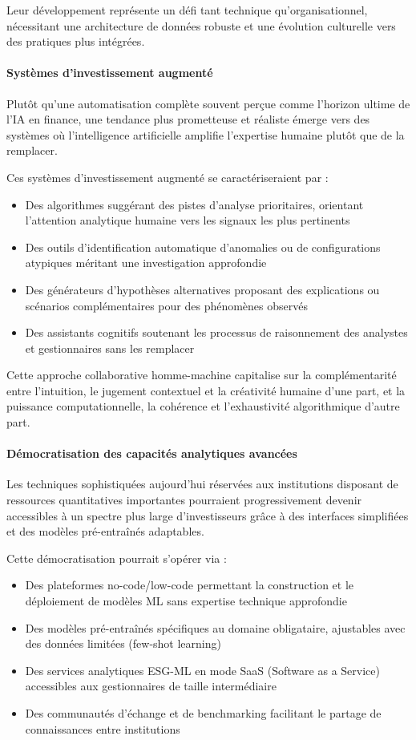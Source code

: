 Leur développement représente un défi tant technique qu'organisationnel, nécessitant une architecture de données robuste et une évolution culturelle vers des pratiques plus intégrées.

\paragraph{Systèmes d'investissement augmenté} 
Plutôt qu'une automatisation complète souvent perçue comme l'horizon ultime de l'IA en finance, une tendance plus prometteuse et réaliste émerge vers des systèmes où l'intelligence artificielle amplifie l'expertise humaine plutôt que de la remplacer.

Ces systèmes d'investissement augmenté se caractériseraient par :
\begin{itemize}
    \item Des algorithmes suggérant des pistes d'analyse prioritaires, orientant l'attention analytique humaine vers les signaux les plus pertinents
    \item Des outils d'identification automatique d'anomalies ou de configurations atypiques méritant une investigation approfondie
    \item Des générateurs d'hypothèses alternatives proposant des explications ou scénarios complémentaires pour des phénomènes observés
    \item Des assistants cognitifs soutenant les processus de raisonnement des analystes et gestionnaires sans les remplacer
\end{itemize}

Cette approche collaborative homme-machine capitalise sur la complémentarité entre l'intuition, le jugement contextuel et la créativité humaine d'une part, et la puissance computationnelle, la cohérence et l'exhaustivité algorithmique d'autre part.

\paragraph{Démocratisation des capacités analytiques avancées} 
Les techniques sophistiquées aujourd'hui réservées aux institutions disposant de ressources quantitatives importantes pourraient progressivement devenir accessibles à un spectre plus large d'investisseurs grâce à des interfaces simplifiées et des modèles pré-entraînés adaptables.

Cette démocratisation pourrait s'opérer via :
\begin{itemize}
    \item Des plateformes no-code/low-code permettant la construction et le déploiement de modèles ML sans expertise technique approfondie
    \item Des modèles pré-entraînés spécifiques au domaine obligataire, ajustables avec des données limitées (few-shot learning)
    \item Des services analytiques ESG-ML en mode SaaS (Software as a Service) accessibles aux gestionnaires de taille intermédiaire
    \item Des communautés d'échange et de benchmarking facilitant le partage de connaissances entre institutions
\end{itemize}


